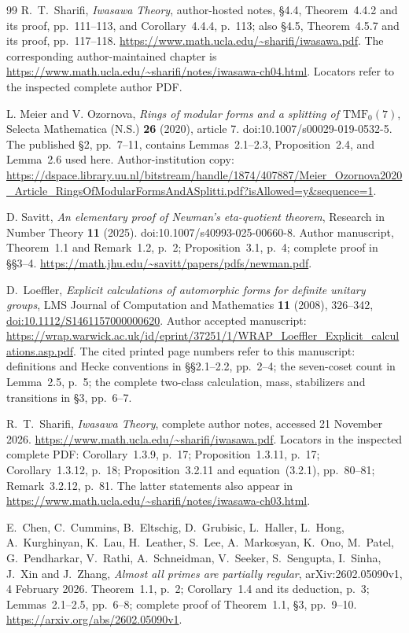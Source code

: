 \documentclass[11pt,a4paper]{article}
\theoremstyle{definition}
\begin{document}
\begin{thebibliography}{99}
R.~T.~Sharifi, \emph{Iwasawa Theory}, author-hosted notes,
\S4.4, Theorem~4.4.2 and its proof, pp.~111--113,
and Corollary~4.4.4, p.~113; also \S4.5,
Theorem~4.5.7 and its proof, pp.~117--118.
\url{https://www.math.ucla.edu/~sharifi/iwasawa.pdf}.
The corresponding author-maintained chapter is
\url{https://www.math.ucla.edu/~sharifi/notes/iwasawa-ch04.html}.
Locators refer to the inspected complete author PDF.

L. Meier and V. Ozornova,
\emph{Rings of modular forms and a splitting of \(\mathrm{TMF}_0(7)\)},
Selecta Mathematica (N.S.) \textbf{26} (2020), article 7.
doi:10.1007/s00029-019-0532-5.
The published \S2, pp.~7--11, contains Lemmas~2.1--2.3,
Proposition~2.4, and Lemma~2.6 used here.
Author-institution copy:
\url{https://dspace.library.uu.nl/bitstream/handle/1874/407887/Meier_Ozornova2020_Article_RingsOfModularFormsAndASplitti.pdf?isAllowed=y&sequence=1}.


D. Savitt,
\emph{An elementary proof of Newman's eta-quotient theorem},
Research in Number Theory \textbf{11} (2025).
doi:10.1007/s40993-025-00660-8.
Author manuscript, Theorem~1.1 and Remark~1.2, p.~2;
Proposition~3.1, p.~4; complete proof in \S\S3--4.
\url{https://math.jhu.edu/~savitt/papers/pdfs/newman.pdf}.

D.~Loeffler, \emph{Explicit calculations of automorphic forms for
definite unitary groups}, LMS Journal of Computation and Mathematics
\textbf{11} (2008), 326--342,
\href{https://doi.org/10.1112/S1461157000000620}{doi:10.1112/S1461157000000620}.
Author accepted manuscript:
\url{https://wrap.warwick.ac.uk/id/eprint/37251/1/WRAP_Loeffler_Explicit_calculations.asp.pdf}.
The cited printed page numbers refer to this manuscript: definitions
and Hecke conventions in \S\S2.1--2.2, pp.~2--4; the seven-coset
count in Lemma~2.5, p.~5; the complete two-class calculation,
mass, stabilizers and transitions in \S3, pp.~6--7.

R.~T.~Sharifi, \emph{Iwasawa Theory}, complete author notes,
accessed 21 November 2026.
\url{https://www.math.ucla.edu/~sharifi/iwasawa.pdf}.
Locators in the inspected complete PDF: Corollary~1.3.9, p.~17;
Proposition~1.3.11, p.~17; Corollary~1.3.12, p.~18;
Proposition~3.2.11 and equation~(3.2.1), pp.~80--81;
Remark~3.2.12, p.~81. The latter statements also appear in
\url{https://www.math.ucla.edu/~sharifi/notes/iwasawa-ch03.html}.

E.~Chen, C.~Cummins, B.~Eltschig, D.~Grubisic, L.~Haller,
L.~Hong, A.~Kurghinyan, K.~Lau, H.~Leather, S.~Lee,
A.~Markosyan, K.~Ono, M.~Patel, G.~Pendharkar, V.~Rathi,
A.~Schneidman, V.~Seeker, S.~Sengupta, I.~Sinha, J.~Xin
and J.~Zhang,
\emph{Almost all primes are partially regular},
arXiv:2602.05090v1, 4 February 2026.
Theorem~1.1, p.~2; Corollary~1.4 and its deduction, p.~3;
Lemmas~2.1--2.5, pp.~6--8; complete proof of Theorem~1.1,
\S3, pp.~9--10.
\url{https://arxiv.org/abs/2602.05090v1}.


\end{thebibliography}
\end{document}
